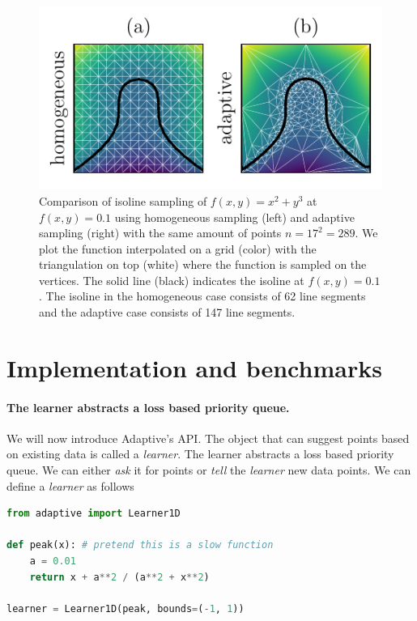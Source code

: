 \begin{figure}
\hypertarget{fig:isoline}{%
\centering
\includegraphics{chapter_adaptive/figures/isoline.pdf}
\caption{Comparison of isoline sampling of $f(x,y)=x^2 + y^3$ at $f(x,y)=0.1$ using homogeneous sampling (left) and adaptive sampling (right) with the same amount of points $n=17^2=289$.
We plot the function interpolated on a grid (color) with the triangulation on top (white) where the function is sampled on the vertices.
The solid line (black) indicates the isoline at $f(x,y)=0.1$.
The isoline in the homogeneous case consists of 62 line segments and the adaptive case consists of 147 line segments.}\label{fig:isoline}
}
\end{figure}

\hypertarget{implementation-and-benchmarks}{%
\section{Implementation and benchmarks}\label{implementation-and-benchmarks}}

\hypertarget{the-learner-abstracts-a-loss-based-priority-queue.}{%
\paragraph{The learner abstracts a loss based priority queue.}\label{the-learner-abstracts-a-loss-based-priority-queue.}}

We will now introduce Adaptive's API.
The object that can suggest points based on existing data is called a \emph{learner}.
The learner abstracts a loss based priority queue.
We can either \emph{ask} it for points or \emph{tell} the \emph{learner} new data points.
We can define a \emph{learner} as follows

\begin{lstlisting}[language=Python]
from adaptive import Learner1D

def peak(x): # pretend this is a slow function
    a = 0.01
    return x + a**2 / (a**2 + x**2)

learner = Learner1D(peak, bounds=(-1, 1))
\end{lstlisting}

